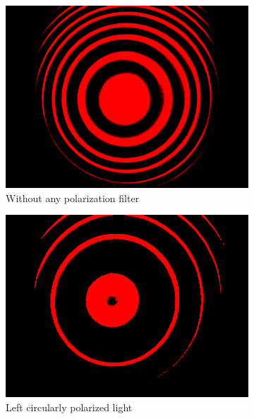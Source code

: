 \begin{figure}
    \centering
    \begin{subfigure}[b]{0.45\textwidth}
        \centering
        \includegraphics[width=\textwidth]{images/longitudinal_no_polarizer.png}
        \caption{Without any polarization filter}
    \end{subfigure}
    \hfill
    \begin{subfigure}[b]{0.45\textwidth}
        \centering
        \includegraphics[width=\textwidth]{images/left.png}
        \caption{Left circularly polarized light}
    \end{subfigure}
    \hfill
    \begin{subfigure}[b]{0.45\textwidth}
        \centering

\end{subfigure}
\end{figure}
